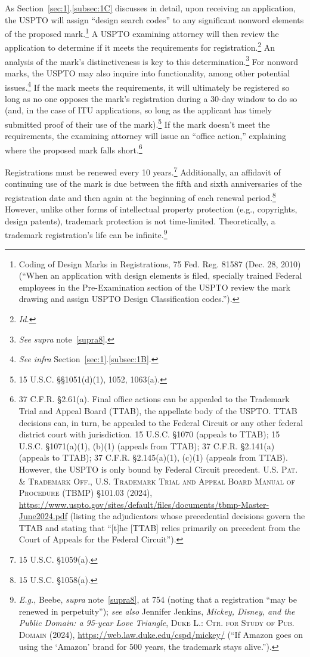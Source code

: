 \documentclass[letterpaper, 11pt, oneside]{article}
\begin{document}
As Section~\ref{sec:1}.\ref{subsec:1C} discusses in detail, upon receiving an application, the USPTO will assign ``design search codes'' to any significant nonword elements of the proposed mark.\footnote{\label{supra10} Coding of Design Marks in Registrations, 75 Fed. Reg. 81587 (Dec. 28, 2010) (``When an application with design elements is filed, specially trained Federal employees in the Pre-Examination section of the USPTO review the mark drawing and assign USPTO Design Classification codes.'').} A USPTO examining attorney will then review the application to determine if it meets the requirements for registration.\footnote{\textit{Id.}} An analysis of the mark's distinctiveness is key to this determination.\footnote{\textit{See supra} note~\ref{supra8}.}  For nonword marks, the USPTO may also inquire into functionality, among other potential issues.\footnote{\textit{See infra} Section~\ref{sec:1}.\ref{subsec:1B}.} If the mark meets the requirements, it will ultimately be registered so long as no one opposes the mark's registration during a 30-day window to do so (and, in the case of ITU applications, so long as the applicant has timely submitted proof of their use of the mark).\footnote{15 U.S.C. \S\S 1051(d)(1), 1052, 1063(a).} If the mark doesn't meet the requirements, the examining attorney will issue an ``office action,'' explaining where the proposed mark falls short.\footnote{37 C.F.R. \S 2.61(a). Final office actions can be appealed to the Trademark Trial and Appeal Board (TTAB), the appellate body of the USPTO. TTAB decisions can, in turn, be appealed to the Federal Circuit or any other federal district court with jurisdiction. 15 U.S.C. \S 1070 (appeals to TTAB); 15 U.S.C. \S 1071(a)(1), (b)(1) (appeals from TTAB); 37 C.F.R. \S 2.141(a) (appeals to TTAB); 37 C.F.R. \S 2.145(a)(1), (c)(1) (appeals from TTAB). However, the USPTO is only bound by Federal Circuit precedent. \textsc{U.S. Pat. \& Trademark Off., U.S. Trademark Trial and Appeal Board Manual of Procedure (TBMP)} \S 101.03 (2024), \url{https://www.uspto.gov/sites/default/files/documents/tbmp-Master-June2024.pdf} (listing the adjudicators whose precedential decisions govern the TTAB and stating that ``[t]he [TTAB] relies primarily on precedent from the Court of Appeals for the Federal Circuit'').}

Registrations must be renewed every 10 years.\footnote{15 U.S.C. \S 1059(a).} Additionally, an affidavit of continuing use of the mark is due between the fifth and sixth anniversaries of the registration date and then again at the beginning of each renewal period.\footnote{15 U.S.C. \S 1058(a).} However, unlike other forms of intellectual property protection (e.g., copyrights, design patents), trademark protection is not time-limited. Theoretically, a trademark registration's life can be infinite.\footnote{\textit{E.g.}, Beebe, \textit{supra} note~\ref{supra8}, at 754 (noting that a registration ``may be renewed in perpetuity''); \textit{see also} Jennifer Jenkins, \textit{Mickey, Disney, and the Public Domain: a 95-year Love Triangle}, \textsc{Duke L.: Ctr. for Study of Pub. Domain} (2024), \url{https://web.law.duke.edu/cspd/mickey/} (``If Amazon goes on using the `Amazon' brand for 500 years, the trademark stays alive.'').} 
\end{document}
